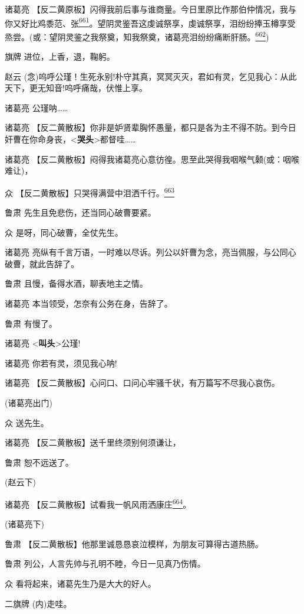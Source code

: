 诸葛亮
【反二黄原板】闪得我前后事与谁商量。今日里原比作那伯仲情况，我与你又好比鸡黍范、张\protect\hyperlink{fn661}{\textsuperscript{661}}。{望阴灵鉴吾这虔诚祭享，虔诚祭享，泪纷纷捧玉樽享受烝尝。}(或：望阴灵鉴之我祭奠，知我祭奠，诸葛亮泪纷纷痛断肝肠。\protect\hyperlink{fn662}{\textsuperscript{662}})

旗牌 进位，上香，退，鞠躬。

赵云
(念)呜呼公瑾！生死永别!朴守其真，冥冥灭灭，君如有灵，乞见我心：从此天下，更无知音!呜呼痛哉，伏惟上享。

诸葛亮 公瑾呐\ldots{}\ldots{}

诸葛亮
【反二黄散板】你非是妒贤辈胸怀愚量，都只是各为主不得不防。到今日奸曹在你命身丧，\textless{}\textbf{哭头}\textgreater{}都督哇\ldots{}\ldots{}

诸葛亮
【反二黄散板】闷得我诸葛亮心意彷徨。思至此哭得我{咽喉气颡}(或：咽喉难让)，

众
【反二黄散板】只哭得满营中泪洒千行。\protect\hyperlink{fn663}{\textsuperscript{663}}

鲁肃 先生且免悲伤，还当同心破曹要紧。

众 是呀，同心破曹，全仗先生。

诸葛亮
亮纵有千言万语，一时难以尽诉。列公以奸曹为念，亮当佩服，与公同心破曹，就此告辞了。

鲁肃 且慢，备得水酒，聊表地主之情。

诸葛亮 本当领受，怎奈有公务在身，告辞了。

鲁肃 有慢了。

诸葛亮 \textless{}\textbf{叫头}\textgreater{}公瑾!

诸葛亮 你若有灵，须见我心呐!

诸葛亮 【反二黄散板】心问口、口问心牢骚千状，有万篇写不尽我心哀伤。

(诸葛亮出门)

众 送先生。

诸葛亮 【反二黄散板】送千里终须别何须谦让，

鲁肃 恕不远送了。

(赵云下)

诸葛亮
【反二黄散板】试看我一帆风雨洒康庄\protect\hyperlink{fn664}{\textsuperscript{664}}。

(诸葛亮下)

鲁肃 【反二黄散板】他那里诚恳恳哀泣模样，为朋友可算得古道热肠。

鲁肃 列公，人言先帅与孔明不睦，今日一见真乃伤情。

众 看将起来，诸葛先生乃是大大的好人。

二旗牌 (内)走哇。

